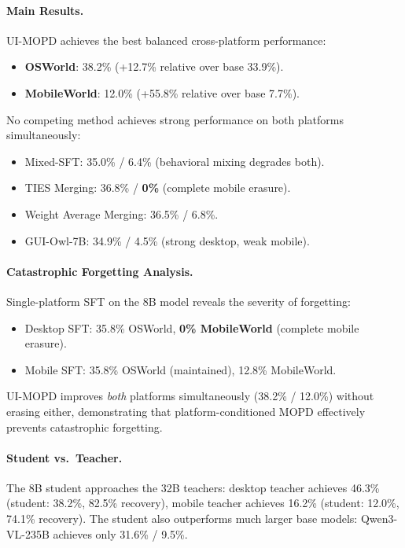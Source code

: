 \documentclass[11pt,a4paper]{article}
\begin{document}
\paragraph{Main Results.} UI-MOPD achieves the best balanced cross-platform performance:
\begin{itemize}
\item \textbf{OSWorld}: 38.2\% (+12.7\% relative over base 33.9\%).
\item \textbf{MobileWorld}: 12.0\% (+55.8\% relative over base 7.7\%).
\end{itemize}
No competing method achieves strong performance on both platforms simultaneously:
\begin{itemize}
\item Mixed-SFT: 35.0\% / 6.4\% (behavioral mixing degrades both).
\item TIES Merging: 36.8\% / \textbf{0\%} (complete mobile erasure).
\item Weight Average Merging: 36.5\% / 6.8\%.
\item GUI-Owl-7B: 34.9\% / 4.5\% (strong desktop, weak mobile).
\end{itemize}

\paragraph{Catastrophic Forgetting Analysis.} Single-platform SFT on the 8B model reveals the severity of forgetting:
\begin{itemize}
\item Desktop SFT: 35.8\% OSWorld, \textbf{0\% MobileWorld} (complete mobile erasure).
\item Mobile SFT: 35.8\% OSWorld (maintained), 12.8\% MobileWorld.
\end{itemize}
UI-MOPD improves \emph{both} platforms simultaneously (38.2\% / 12.0\%) without erasing either, demonstrating that platform-conditioned MOPD effectively prevents catastrophic forgetting.

\paragraph{Student vs.\ Teacher.} The 8B student approaches the 32B teachers: desktop teacher achieves 46.3\% (student: 38.2\%, 82.5\% recovery), mobile teacher achieves 16.2\% (student: 12.0\%, 74.1\% recovery). The student also outperforms much larger base models: Qwen3-VL-235B achieves only 31.6\% / 9.5\%.
\end{document}
